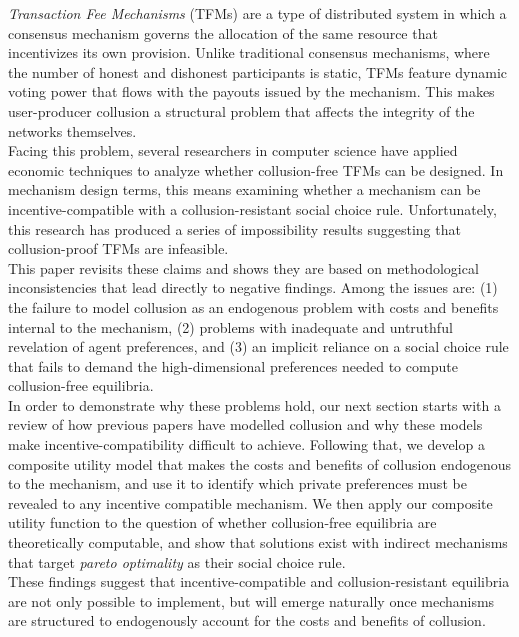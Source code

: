 \documentclass[11pt,a4paper]{llncs}
\begin{document}
\emph{Transaction Fee Mechanisms} (TFMs) are a type of distributed system in which a consensus mechanism governs the allocation of the same resource that incentivizes its own provision. Unlike traditional consensus mechanisms, where the number of honest and dishonest participants is static, TFMs feature dynamic voting power that flows with the payouts issued by the mechanism. This makes user-producer collusion a structural problem that affects the integrity of the networks themselves.
\vspace{0.2cm} \\
Facing this problem, several researchers in computer science have applied economic techniques to analyze whether collusion-free TFMs can be designed. In mechanism design terms, this means examining whether a mechanism can be incentive-compatible with a collusion-resistant social choice rule. Unfortunately, this research has produced a series of impossibility results suggesting that collusion-proof TFMs are infeasible.
\vspace{0.2cm} \\
This paper revisits these claims and shows they are based on methodological inconsistencies that lead directly to negative findings. Among the issues are: (1) the failure to model collusion as an endogenous problem with costs and benefits internal to the mechanism, (2) problems with inadequate and untruthful revelation of agent preferences, and (3) an implicit reliance on a social choice rule that fails to demand the high-dimensional preferences needed to compute collusion-free equilibria.
\vspace{0.2cm} \\
In order to demonstrate why these problems hold, our next section starts with a review of how previous papers have modelled collusion and why these models make incentive-compatibility difficult to achieve. Following that, we develop a composite utility model that makes the costs and benefits of collusion endogenous to the mechanism, and use it to identify which private preferences must be revealed to any incentive compatible mechanism. We then apply our composite utility function to the question of whether collusion-free equilibria are theoretically computable, and show that solutions exist with indirect mechanisms that target \textit{pareto optimality} as their social choice rule.
\vspace{0.2cm} \\
These findings suggest that incentive-compatible and collusion-resistant equilibria are not only possible to implement, but will emerge naturally once mechanisms are structured to endogenously account for the costs and benefits of collusion.
\end{document}
